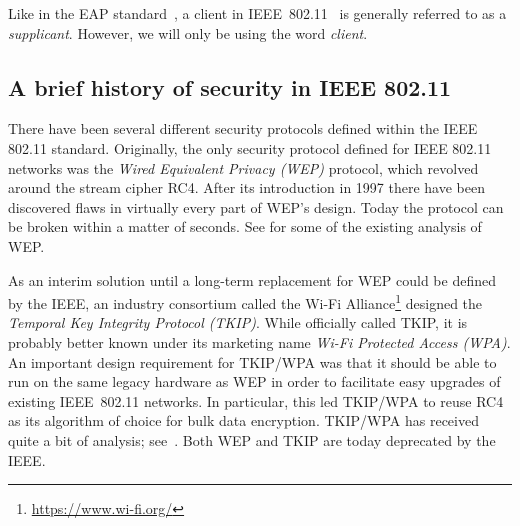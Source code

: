 Like in the EAP standard~\cite{IETF:RFC3748:EAP},
a client in IEEE~802.11~\cite{IEEE:2012:802.11} is generally referred to as a \emph{supplicant}.  
However,
we will only be using the word \emph{client}.

\subsection{A brief history of security in IEEE 802.11}\label{sec:802.11:security_history}
There have been several different security protocols defined within the IEEE 802.11 standard.
Originally,
the only security protocol defined for IEEE 802.11 networks was the \emph{Wired Equivalent Privacy (WEP)} protocol,
which revolved around the stream cipher RC4.
After its introduction in 1997 there have been discovered flaws in virtually every part of WEP's design.
Today the protocol can be broken within a matter of seconds.
See \cite{Walker:2000:WEP_unsafe,SAC:FluManSha01,BorisovGW:2001:insecurity_802.11,NDSS:StuIoaRub02,Cam-WingetHWW:2003:Flaws_802.11_link_protocol,StubblefieldIR:2004:WEP_802.11b_attack,MishraPAF:2004:802.11_issues_survey,SP:BitHanLac06,EPRINT:Tews07,WISA:TewWeiPys07,Tews:2009:PAA,MoriiT:2011:RC4_WPA,FSE:SSVV13}
for some of the existing analysis of WEP.



As an interim solution until a long-term replacement for WEP could be defined by the IEEE,
an industry consortium called the Wi-Fi Alliance\footnote{\url{https://www.wi-fi.org/}} designed the \emph{Temporal Key Integrity Protocol (TKIP)}.
While officially called TKIP,
it is probably better known under its marketing name \emph{Wi-Fi Protected Access (WPA)}.
An important design requirement for TKIP/WPA was that it should be able to run on the same legacy hardware as WEP in order to facilitate easy upgrades of existing IEEE~802.11 networks.
In particular,
this led TKIP/WPA to reuse RC4 as its algorithm of choice for bulk data encryption.
TKIP/WPA has received quite a bit of analysis; see~\cite{Moen:2004:WPA_hash_weakness,Wool:2004:fragility_of_Michael,Tews:2009:PAA,EC:SepVauVua11,HalvorsenHEM:2009:improved_TKIP_attacks,MoriiT:2011:RC4_WPA,TodoOOM:2012:Falsification_attacks_TKIP,ASIACCS:VanPie13,FSE:GMMPS14,FSE:PatPoeSch14,FSE:ItoMiy15,VanhoefP:2016:Biases_belong_us_TKIP_TLS}.
Both WEP and TKIP are today deprecated by the IEEE.

